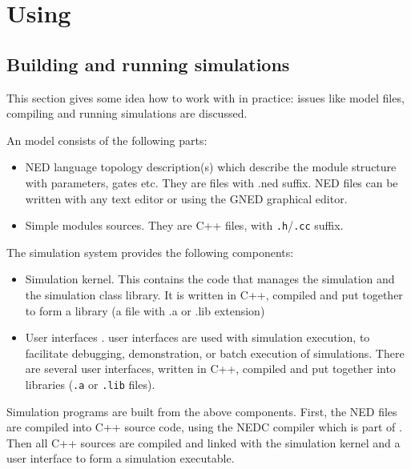 \section{Using {\opp}}


\subsection{Building and running simulations}

This section gives some idea how to work with {\opp} in practice:
issues like model files, compiling and running simulations are
discussed.

An {\opp} model consists of the following parts:
\begin{itemize}
  \item{NED language topology description(s) which
    describe the module structure with parameters, gates etc. They are
    files with .ned suffix. NED files can be written with any text
    editor or using the GNED graphical editor.}
  \item{ Simple modules sources. They are C++ files, with \texttt{.h}/\texttt{.cc} suffix.}
\end{itemize}

The simulation system provides the following components:
\begin{itemize}
  \item{Simulation kernel. This contains the
    code that manages the simulation and the simulation class library.
    It is written in C++, compiled and put together to form a library
    (a file with .a or .lib extension)}
  \item{User interfaces
    . {\opp} user interfaces
    are used with simulation execution, to facilitate debugging,
    demonstration, or batch execution of simulations. There are
    several user interfaces, written in C++, compiled and put together
    into libraries (\texttt{.a} or \texttt{.lib} files).}
\end{itemize}


Simulation programs are built from the above components. First, the
NED files are compiled into C++ source code, using
the NEDC compiler which is part of {\opp}. Then
all C++ sources are compiled and linked with the simulation kernel and
a user interface to form a simulation executable.



